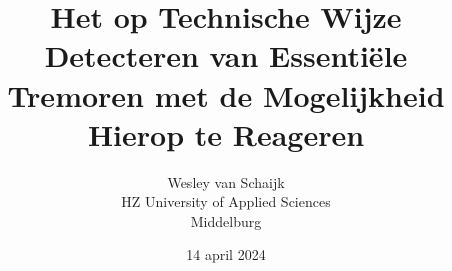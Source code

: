 \documentclass{article}
\title{Het op Technische Wijze Detecteren van Essentiële Tremoren met de Mogelijkheid Hierop te Reageren}
\author{Wesley van Schaijk \\ HZ University of Applied Sciences \\ Middelburg}
\date{14 april 2024}
\begin{document}
\maketitle




\newpage
\begin{multicols}{2}
    
    
    
    
    
    
    
\end{multicols}


{
    \raggedright
    
    
}

\newpage

\end{document}

